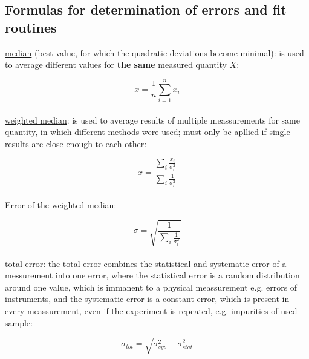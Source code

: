 \subsection{Formulas for determination of errors and fit routines}
    \label{errorformulas}

    \underline{median} (best value, for which the quadratic deviations become
    minimal): is used to average different values for \textbf{the same} measured
    quantity $X$:

    \begin{equation}
        \bar{x}=\frac{1}{n} \overset{n}{\underset{i=1}{\sum}} x_i
        \label{eq:median}
    \end{equation}
    \\

    \underline{weighted median}: is used to average results of multiple
    meassurements for same quantity, in which different methods were used; must
    only be apllied if single results are close enough to each other:

    \begin{equation}
        \bar{x} = \frac{\underset{i}{\sum }\frac{x_i}{\sigma_i^2}}{\underset{i}{\sum }\frac{1}{\sigma_i^2}}
        \label{eq:weightedmedian}
    \end{equation}
    \\

    \underline{Error of the weighted median}:

    \begin{equation}
        \sigma = \sqrt{\frac{1}{\underset{i}{\sum}\frac{1}{\sigma_i^2}}}
        \label{eq:errorweightedmedian}
    \end{equation}
    \\

    \underline{total error}: the total error combines the statistical and
    systematic error of a messurement into one error, where the statistical
    error is a random distribution around one value, which is immanent to a
    physical meassurement e.g. errors of instruments, and the systematic error
    is a constant error, which is present in every meassurement, even if the
    experiment is repeated, e.g. impurities of used sample:
    
    \begin{equation}
        \sigma_{tot} =\sqrt{\sigma_{sys}^2+\sigma_{stat}^2}
        \label{eq:totalerror}
    \end{equation}
    \\

